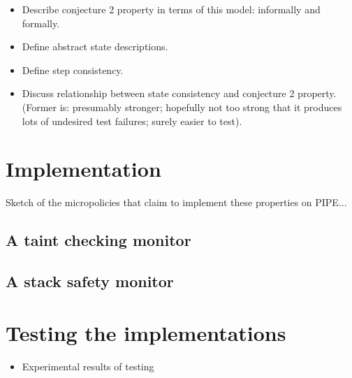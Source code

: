 \documentclass[conference]{IEEEtran}
\newif\iftext \textfalse
\begin{document}
\begin{itemize}
\begin {itemize}
  \end {itemize}
\item
  Describe conjecture 2 property in terms of this model: informally and formally.
\item
  Define abstract state descriptions.
\item
  Define step consistency.
\item
  Discuss relationship between state consistency and conjecture 2 property.  (Former is: presumably stronger; hopefully not
  too strong that it produces lots of undesired test failures; surely easier to test).

\end{itemize}







\iftext
\section{Stack + heap protection too}

POTENTIALLY: Memory safety (before stack) + Conjunction of memory + stack
safety (after).

(Memory safety by itself is just arthur’s paper, but it’s cool to see how
they are combined, especially what bits can be factored out as common
structure, e.g. the notion of accessibility)
\fi

\section{Implementation}

Sketch of the micropolicies that claim to implement these properties on
PIPE...

\subsection{A taint checking monitor}

\subsection{A stack safety monitor}

\section{Testing the implementations}

\begin{itemize}
\item Experimental results of testing
\end{itemize}
\end{document}
